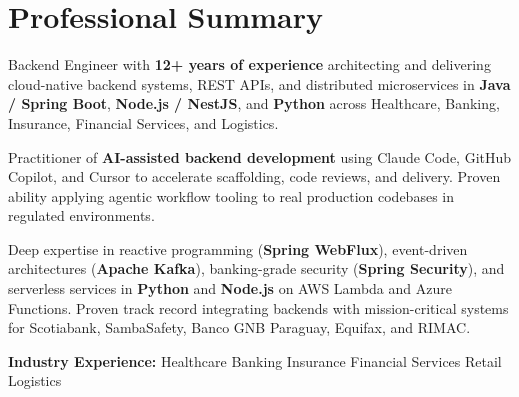 
\section{Professional Summary}

{\small
Backend Engineer with \textbf{12+ years of experience} architecting and delivering cloud-native
backend systems, REST APIs, and distributed microservices in \textbf{Java / Spring Boot},
\textbf{Node.js / NestJS}, and \textbf{Python} across Healthcare, Banking, Insurance, Financial
Services, and Logistics.

\vspace{4pt}
Practitioner of \textbf{AI-assisted backend development} using Claude Code, GitHub Copilot, and
Cursor to accelerate scaffolding, code reviews, and delivery. Proven ability applying agentic
workflow tooling to real production codebases in regulated environments.

\vspace{4pt}
Deep expertise in reactive programming (\textbf{Spring WebFlux}), event-driven architectures
(\textbf{Apache Kafka}), banking-grade security (\textbf{Spring Security}), and serverless
services in \textbf{Python} and \textbf{Node.js} on AWS Lambda and Azure Functions. Proven track
record integrating backends with mission-critical systems for Scotiabank, SambaSafety, Banco GNB
Paraguay, Equifax, and RIMAC.
}

\vspace{4pt}
{\small\color{cvMuted}%
  \textbf{Industry Experience:}\enspace%
  Healthcare\enspace\textbar\enspace
  Banking\enspace\textbar\enspace
  Insurance\enspace\textbar\enspace
  Financial Services\enspace\textbar\enspace
  Retail\enspace\textbar\enspace
  Logistics%
}
